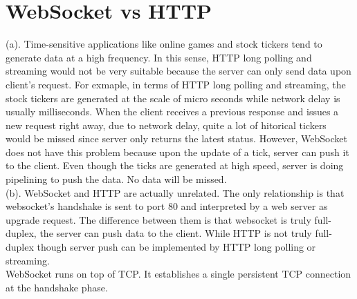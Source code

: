 \documentclass[titlepage, paper=a4, fontsize=11pt]{scrartcl} %
\numberwithin{equation}{section} %
\numberwithin{figure}{section} %
\numberwithin{table}{section} %
\begin{document}

\section*{WebSocket vs HTTP}
(a). Time-sensitive applications like online games and stock tickers tend to generate data at a high frequency.
In this sense, HTTP long polling and streaming would not be very suitable because the server can only send data
upon client's request. For exmaple, in terms of HTTP long polling and streaming, the stock tickers are generated at the scale of micro seconds while network delay is usually milliseconds. When the client receives a previous response and issues a new request right away, due to network delay, quite a lot of hitorical tickers would be missed since server only returns the latest status. However, WebSocket does not have this problem because upon the update of a tick, server can push it to the client. Even though the ticks are generated at high speed, server is doing pipelining to push the data. No data will be missed. \\

(b). WebSocket and HTTP are actually unrelated. The only relationship is that websocket's handshake is sent to port 80 and interpreted by a web server as upgrade request. The difference between them is that websocket is truly full-duplex, the server can push data to the client. While HTTP is not truly full-duplex though server push can be implemented by HTTP long polling or streaming. \\

WebSocket runs on top of TCP. It establishes a single persistent TCP connection at the handshake phase.
\\
\end{document}
